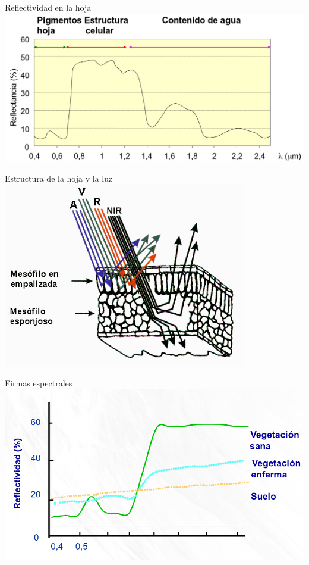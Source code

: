 \documentclass{beamer}
\begin{document}
\begin{frame}{Reflectividad en la hoja}
	\centering
	\includegraphics[width=1\textwidth]{IMGs/reflechoja}
\end{frame}

\begin{frame}{Estructura de la hoja y la luz}
	\centering
	\includegraphics[width=0.8\textwidth]{IMGs/hojayluz}
\end{frame}

\begin{frame}{Firmas espectrales}
	\centering
	\includegraphics[width=1\textwidth]{IMGs/vegetacion}
\end{frame}
\end{document}
